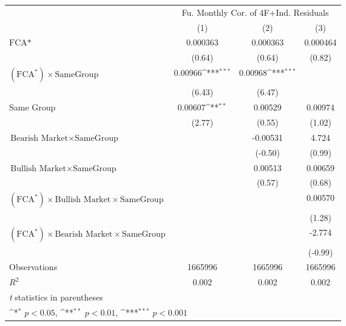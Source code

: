 {
\def\sym#1{\ifmmode^{#1}\else\(^{#1}\)\fi}
\begin{tabular}{l*{3}{c}}
\hline\hline
                &\multicolumn{3}{c}{Fu. Monthly Cor. of 4F+Ind. Residuals}\\\cmidrule(lr){2-4}
                &\multicolumn{1}{c}{(1)}         &\multicolumn{1}{c}{(2)}         &\multicolumn{1}{c}{(3)}         \\
\hline
$ \text{FCA*} $ & 0.000363         & 0.000363         & 0.000464         \\
                &   (0.64)         &   (0.64)         &   (0.82)         \\
[1em]
 $ (\text{FCA}^*) \times {\text{SameGroup} }  $ &  0.00966\sym{***}&  0.00968\sym{***}&                  \\
                &   (6.43)         &   (6.47)         &                  \\
[1em]
Same Group      &  0.00607\sym{**} &  0.00529         &  0.00974         \\
                &   (2.77)         &   (0.55)         &   (1.02)         \\
[1em]
$ {\text{Bearish Market} } \times {\text{SameGroup} }  $ &                  & -0.00531         &    4.724         \\
                &                  &  (-0.50)         &   (0.99)         \\
[1em]
$ {\text{Bullish Market} } \times {\text{SameGroup} }  $ &                  &  0.00513         &  0.00659         \\
                &                  &   (0.57)         &   (0.68)         \\
[1em]
$ (\text{FCA}^*) \times {\text{Bullish Market}} \times {\text{SameGroup} }  $ &                  &                  &  0.00570         \\
                &                  &                  &   (1.28)         \\
[1em]
$ (\text{FCA}^*) \times {\text{Bearish Market}} \times {\text{SameGroup} }  $ &                  &                  &   -2.774         \\
                &                  &                  &  (-0.99)         \\
\hline
Observations    &  1665996         &  1665996         &  1665996         \\
\(R^{2}\)       &    0.002         &    0.002         &    0.002         \\
\hline\hline
\multicolumn{4}{l}{\footnotesize \textit{t} statistics in parentheses}\\
\multicolumn{4}{l}{\footnotesize \sym{*} \(p<0.05\), \sym{**} \(p<0.01\), \sym{***} \(p<0.001\)}\\
\end{tabular}
}
